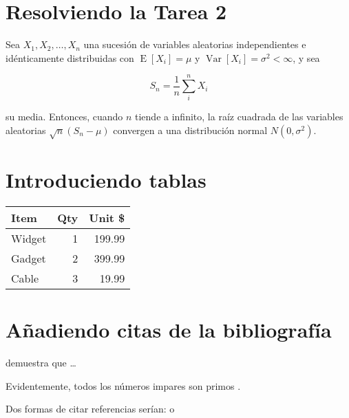 \documentclass[12pt,a4paper]{article}
\begin{document}
\section*{Resolviendo la Tarea 2}

Sea $X_1, X_2, \ldots, X_n$ una sucesión de variables aleatorias independientes e idénticamente distribuidas con $\operatorname{E}[X_i] = \mu$ y $\operatorname{Var}[X_i] = \sigma^2  < \infty$, y sea

\begin{equation*}
S_n = \frac{1}{n} \sum_{i}^{n}X_i
\end{equation*}

su media. Entonces, cuando $n$ tiende a infinito, la raíz cuadrada de las variables aleatorias $\sqrt{n} (S_n - \mu)$ convergen a una distribución normal $N(0, \sigma^2)$.

\section*{Introduciendo tablas}

\begin{table}[h!]
\centering
\begin{tabular}{|l|r|r|} \hline
Item   & Qty & Unit \$ \\\hline
Widget &   1 & 199.99 \\
Gadget &   2 & 399.99 \\
Cable  &   3 & 19.99 \\\hline
\end{tabular}
\end{table}

\section*{Añadiendo citas de la bibliografía}

\citet{Brooks1997Methodology}
demuestra que \ldots

Evidentemente, todos los números impares son primos \citep{Jacobson1999Towards}.

Dos formas de citar referencias serían:
\citep{Smith1990Enabling} o \citet{Smith1990Enabling}



\end{document}
